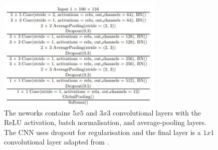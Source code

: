 \begin{figure}[ht!]
  \centering
  \includegraphics[width=8cm]{pictures/cnn_whitebox.jpg}
  \caption{The neworks contains $5x5$ and $3x3$ convolutional layers with the ReLU activation, batch normalisation, and average-pooling layers. The CNN uses dropout for regularisation and the final layer is a $1x1$ convolutional layer adapted from \cite{DBLP:journals/corr/abs-2007-14714}.}
  \label{fig:cnn_whitebox}
\end{figure}


